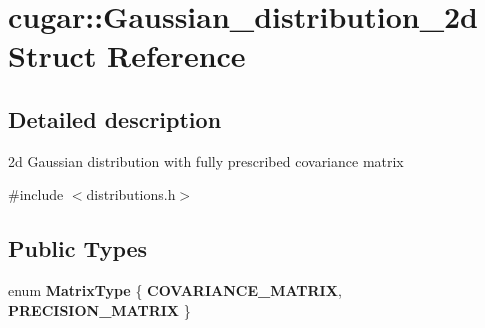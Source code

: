 \hypertarget{structcugar_1_1_gaussian__distribution__2d}{}\section{cugar\+:\+:Gaussian\+\_\+distribution\+\_\+2d Struct Reference}
\label{structcugar_1_1_gaussian__distribution__2d}


\subsection{Detailed description}
2d Gaussian distribution with fully prescribed covariance matrix 

{\ttfamily \#include $<$distributions.\+h$>$}

\subsection*{Public Types}
\begin{DoxyCompactItemize}
\item 
\mbox{\label{structcugar_1_1_gaussian__distribution__2d_aedb48159ce020cd2ba08fb0b9cb98b67}} 
enum {\bfseries Matrix\+Type} \{ {\bfseries C\+O\+V\+A\+R\+I\+A\+N\+C\+E\+\_\+\+M\+A\+T\+R\+IX}, 
{\bfseries P\+R\+E\+C\+I\+S\+I\+O\+N\+\_\+\+M\+A\+T\+R\+IX}
 \}
\end{DoxyCompactItemize}
